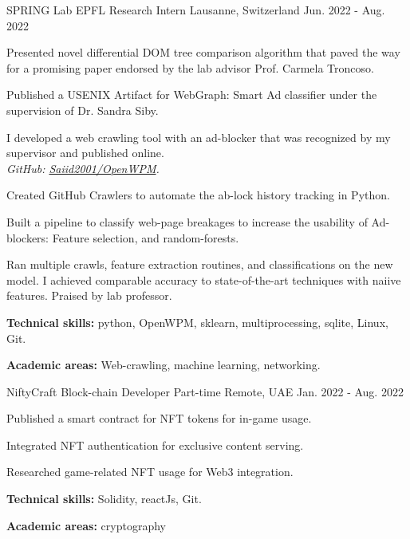 \begin{cventries}
  \cventry
    {SPRING Lab EPFL} %
    {Research Intern} %
    {Lausanne, Switzerland} %
    {Jun.  2022 - Aug. 2022} %
    {
      \begin{cvitems} %
        \item Presented novel differential DOM tree comparison algorithm that paved the way for a promising paper endorsed by the lab advisor Prof. Carmela Troncoso.
        \item Published a USENIX Artifact for WebGraph: Smart Ad classifier under the supervision of Dr. Sandra Siby.
        \item I developed a web crawling tool with an ad-blocker that was recognized by my supervisor and published online.\\\textit{ GitHub: \href{https://www.github.com/Saiid2001/OpenWPM}{Saiid2001/OpenWPM}.} 
        \item Created GitHub Crawlers to automate the ab-lock history tracking in Python.
        \item Built a pipeline to classify web-page breakages to increase the usability of Ad-blockers: Feature selection, and random-forests. 
        \item Ran multiple crawls, feature extraction routines, and classifications on the new model. I achieved comparable accuracy to state-of-the-art techniques with naiive features. Praised by lab professor.
        \item { \textbf{Technical skills: } python, OpenWPM, sklearn, multiprocessing, sqlite, Linux, Git.}
        \item { \textbf {Academic areas:} Web-crawling, machine learning, networking.}
      \end{cvitems}
    }


  \cventry
    {NiftyCraft} %
    {Block-chain Developer Part-time} %
    {Remote, UAE} %
    {Jan. 2022 - Aug. 2022} %
    {
      \begin{cvitems} %
        \item Published a smart contract for NFT tokens for in-game usage.
        \item Integrated NFT authentication for exclusive content serving.
        \item Researched game-related NFT usage for Web3 integration.
        \item { \textbf{Technical skills: } Solidity, reactJs,  Git.}
        \item { \textbf {Academic areas:} cryptography}
      \end{cvitems}
    }


\end{cventries}
\newpage
{}

